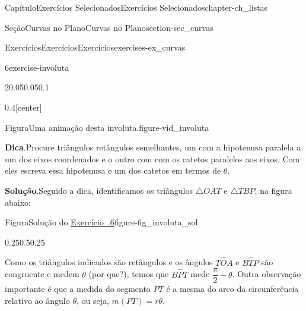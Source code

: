 \documentclass[oneside,10pt,]{book}
\newcommand{\blocktitlefont}{\relax}
\newcommand{\xreffont}{\relax}
\numberwithin{equation}{section}
\begin{document}
\begin{chapterptx}{Capítulo}{Exercícios Selecionados}{}{Exercícios Selecionados}{}{}{chapter-ch_listas}
\begin{sectionptx}{Seção}{Curvas no Plano}{}{Curvas no Plano}{}{}{section-sec_curvas}
\begin{exercises-subsection-numberless}{Exercícios}{Exercícios}{}{Exercícios}{}{}{exercises-ex_curvas}
\begin{divisionexercise}{6}{}{}{exercise-involuta}
\begin{sidebyside}{2}{0.05}{0.05}{0.1}
\begin{sbspanel}{0.4}[center]
\begin{panelfigureptx}{Figura}{Uma animação desta involuta.}{figure-vid_involuta}{}
\tcblower
\end{panelfigureptx}%
\end{sbspanel}%
\end{sidebyside}%
\par\smallskip%
\noindent\textbf{\blocktitlefont Dica}.\hypertarget{hint-involuta-b}{}\quad{}Procure triângulos retângulos semelhantes, um com a hipotenusa paralela a um dos eixos coordenados e o outro com com os catetos paralelos aos eixos. Com eles escreva essa hipotenusa e um dos catetos em termos de \(\theta\).%
\par\smallskip%
\noindent\textbf{\blocktitlefont Solução}.\hypertarget{solution-involuta-c}{}\quad{}Seguido a dica, identificamos os triângulos \(\triangle
OAT\) e \(\triangle TBP\), na figura abaixo: \begin{figureptx}{Figura}{Solução do \hyperlink{exercise-involuta}{Exercício~{\xreffont 1.2.6}}}{figure-fig_involuta_sol}{}%
\begin{image}{0.25}{0.5}{0.25}{}%
%
\end{image}%
\tcblower
\end{figureptx}%
%
\par
Como os triângulos indicados são retângulos e os ângulos \(T\hat{O}A\) e \(B\hat{T}P\) são congruente e medem \(\theta\) (por que?), temos que \(B\hat{P}T\) mede \(\dfrac{\pi}{2}-\theta\). Outra observação importante é que a medida do segmento \(\overline{PT}\) é a mesma do arco da circunferência relativo ao ângulo \(\theta\), ou seja, \(m(PT)=r\theta\).%

\end{divisionexercise}
\end{exercises-subsection-numberless}
\end{sectionptx}
\end{chapterptx}
\end{document}
